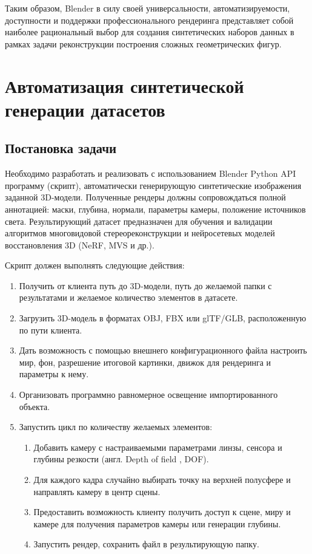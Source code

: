 Таким образом, Blender в силу своей универсальности, автоматизируемости,
доступности и поддержки профессионального рендеринга представляет собой наиболее
рациональный выбор для создания синтетических наборов данных в рамках задачи
реконструкции построения сложных геометрических фигур.

\section{Автоматизация синтетической генерации датасетов}

\subsection{Постановка задачи}
Необходимо разработать и реализовать с использованием Blender Python API программу (скрипт),
автоматически генерирующую синтетические изображения заданной 3D-модели.
Полученные рендеры должны сопровождаться полной аннотацией: маски, глубина,
нормали, параметры камеры, положение источников света. Результирующий датасет
предназначен для обучения и валидации алгоритмов многовидовой
стереореконструкции и нейросетевых моделей восстановления 3D (NeRF, MVS и др.).

\noindent Скрипт должен выполнять следующие действия:
\begin{enumerate}
  \item Получить от клиента путь до 3D-модели, путь до желаемой папки с
  результатами и желаемое количество элементов в датасете.
  \item Загрузить 3D-модель в форматах OBJ, FBX или glTF/GLB, расположенную по пути клиента.
  \item Дать возможность с помощью внешнего конфигурационного файла настроить
  мир, фон, разрешение итоговой картинки, движок для рендеринга и параметры к
  нему.
  \item Организовать программно равномерное освещение импортированного объекта.
  \item Запустить цикл по количеству желаемых элементов:
  \begin{enumerate}
    \item Добавить камеру с настраиваемыми параметрами линзы, сенсора и
    глубины резкости (англ. Depth of field , DOF).
    \item Для каждого кадра случайно выбирать точку на верхней полусфере и
    направлять камеру в центр сцены.
    \item Предоставить возможность клиенту получить доступ к сцене, миру и
    камере для получения параметров камеры или генерации глубины.
    \item Запустить рендер, сохранить файл в результирующую папку.
  \end{enumerate}
\end{enumerate}

